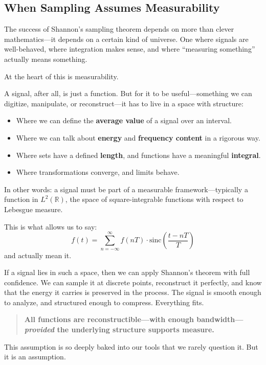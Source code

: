 \subsection{When Sampling Assumes Measurability}

The success of Shannon’s sampling theorem depends on more than clever mathematics—it depends on a certain kind of universe. One where signals are well-behaved, where integration makes sense, and where “measuring something” actually means something.

At the heart of this is measurability.

A signal, after all, is just a function. But for it to be useful—something we can digitize, manipulate, or reconstruct—it has to live in a space with structure:

\begin{itemize}
  \item Where we can define the \textbf{average value} of a signal over an interval.
  \item Where we can talk about \textbf{energy} and \textbf{frequency content} in a rigorous way.
  \item Where sets have a defined \textbf{length}, and functions have a meaningful \textbf{integral}.
  \item Where transformations converge, and limits behave.
\end{itemize}

In other words: a signal must be part of a measurable framework—typically a function in \( L^2(\mathbb{R}) \), the space of square-integrable functions with respect to Lebesgue measure.

This is what allows us to say:
\[
f(t) = \sum_{n=-\infty}^{\infty} f(nT) \cdot \text{sinc}\left(\frac{t - nT}{T}\right)
\]
and actually mean it.

If a signal lies in such a space, then we can apply Shannon’s theorem with full confidence. We can sample it at discrete points, reconstruct it perfectly, and know that the energy it carries is preserved in the process. The signal is smooth enough to analyze, and structured enough to compress. Everything fits.

\begin{quote}
\textbf{All functions are reconstructible—with enough bandwidth—\emph{provided} the underlying structure supports measure.}
\end{quote}

This assumption is so deeply baked into our tools that we rarely question it. But it is an assumption.

